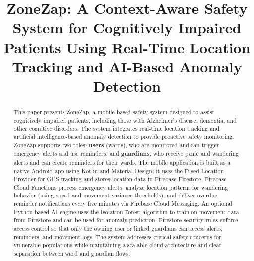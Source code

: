 \documentclass[conference]{IEEEtran}
\begin{document}
\title{ZoneZap: A Context-Aware Safety System for Cognitively Impaired Patients Using Real-Time Location Tracking and AI-Based Anomaly Detection}

\author{
\and
{}
\and
{}
}

\maketitle

\begin{abstract}
This paper presents ZoneZap, a mobile-based safety system designed to assist cognitively impaired patients, including those with Alzheimer's disease, dementia, and other cognitive disorders. The system integrates real-time location tracking and artificial intelligence-based anomaly detection to provide proactive safety monitoring. ZoneZap supports two roles: \textbf{users} (wards), who are monitored and can trigger emergency alerts and use reminders, and \textbf{guardians}, who receive panic and wandering alerts and can create reminders for their wards. The mobile application is built as a native Android app using Kotlin and Material Design; it uses the Fused Location Provider for GPS tracking and stores location data in Firebase Firestore. Firebase Cloud Functions process emergency alerts, analyze location patterns for wandering behavior (using speed and movement variance thresholds), and deliver overdue reminder notifications every five minutes via Firebase Cloud Messaging. An optional Python-based AI engine uses the Isolation Forest algorithm to train on movement data from Firestore and can be used for anomaly prediction. Firestore security rules enforce access control so that only the owning user or linked guardians can access alerts, reminders, and movement logs. The system addresses critical safety concerns for vulnerable populations while maintaining a scalable cloud architecture and clear separation between ward and guardian flows.
\end{abstract}
\end{document}
